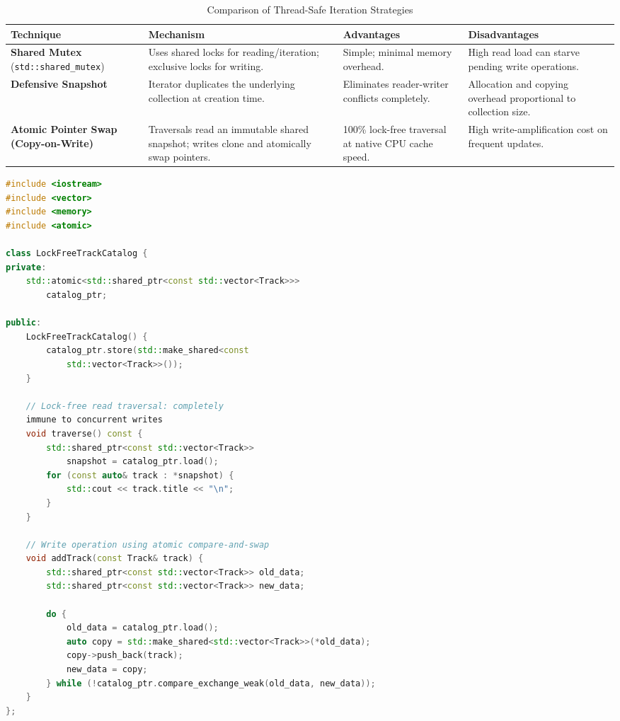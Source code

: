 \begin{table}[htbp]
\centering
\caption{Comparison of Thread-Safe Iteration Strategies}
\begin{tabular}{@{}p{3.6cm} p{4cm} p{3.8cm} p{3.2cm}@{}}
\toprule
\textbf{Technique} & \textbf{Mechanism} & \textbf{Advantages} & \textbf{Disadvantages} \\ \midrule
\textbf{Shared Mutex} (\texttt{std::shared\_mutex}) & Uses shared locks for reading/iteration; exclusive locks for writing. & Simple; minimal memory overhead. & High read load can starve pending write operations. \\ \midrule
\textbf{Defensive Snapshot} & Iterator duplicates the underlying collection at creation time. & Eliminates reader-writer conflicts completely. & Allocation and copying overhead proportional to collection size. \\ \midrule
\textbf{Atomic Pointer Swap (Copy-on-Write)} & Traversals read an immutable shared snapshot; writes clone and atomically swap pointers. & 100\% lock-free traversal at native CPU cache speed. & High write-amplification cost on frequent updates. \\ \bottomrule
\end{tabular}
\end{table}

\begin{lstlisting}[language=C++]
#include <iostream>
#include <vector>
#include <memory>
#include <atomic>

class LockFreeTrackCatalog {
private:
    std::atomic<std::shared_ptr<const std::vector<Track>>> 
        catalog_ptr;

public:
    LockFreeTrackCatalog() {
        catalog_ptr.store(std::make_shared<const        
            std::vector<Track>>());
    }

    // Lock-free read traversal: completely 
    immune to concurrent writes
    void traverse() const {
        std::shared_ptr<const std::vector<Track>> 
            snapshot = catalog_ptr.load();
        for (const auto& track : *snapshot) {
            std::cout << track.title << "\n";
        }
    }

    // Write operation using atomic compare-and-swap
    void addTrack(const Track& track) {
        std::shared_ptr<const std::vector<Track>> old_data;
        std::shared_ptr<const std::vector<Track>> new_data;

        do {
            old_data = catalog_ptr.load();
            auto copy = std::make_shared<std::vector<Track>>(*old_data);
            copy->push_back(track);
            new_data = copy;
        } while (!catalog_ptr.compare_exchange_weak(old_data, new_data));
    }
};
\end{lstlisting}

